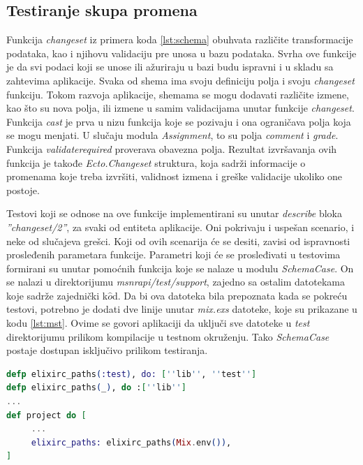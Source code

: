 \documentclass[12pt,oneside]{memoir}
\begin{document}
\subsection{Testiranje skupa promena}
\label{sec:change}
\par Funkcija \emph{changeset} iz primera koda \ref{lst:schema} obuhvata različite transformacije podataka, kao i njihovu validaciju pre unosa u bazu podataka. Svrha ove funkcije je da svi podaci koji se unose ili ažuriraju u bazi budu ispravni i u skladu sa zahtevima aplikacije. Svaka od shema ima svoju definiciju polja i svoju \emph{changeset} funkciju. Tokom razvoja aplikacije, shemama se mogu dodavati različite izmene, kao što su nova polja, ili izmene u samim validacijama unutar funkcije \emph{changeset}. Funkcija \emph{cast} je prva u nizu funkcija koje se pozivaju i ona ograničava polja koja se mogu menjati. U slučaju modula \emph{Assignment}, to su polja \emph{comment} i \emph{grade}. Funkcija \emph{validate{\textunderscore}required} proverava obavezna polja. Rezultat izvršavanja ovih funkcija je takođe \emph{Ecto.Changeset} struktura, koja sadrži informacije o promenama koje treba izvršiti, validnost izmena i greške validacije ukoliko one postoje.
\par Testovi koji se odnose na ove funkcije implementirani su unutar \emph{describe} bloka \emph{''changeset/2''}, za svaki od entiteta aplikacije. Oni pokrivaju i uspešan scenario, i neke od slučajeva grešci. Koji od ovih scenarija će se desiti, zavisi od ispravnosti prosleđenih parametara funkcije. Parametri koji će se prosleđivati u testovima formirani su unutar pomoćnih funkcija koje se nalaze u modulu \emph{SchemaCase}. On se nalazi u direktorijumu \emph{msnr{\textunderscore}api/test/support}, zajedno sa ostalim datotekama koje sadrže zajednički k$\hat{o}$d. Da bi ova datoteka bila prepoznata kada se pokreću testovi, potrebno je dodati dve linije unutar \emph{mix.exs} datoteke, koje su prikazane u kodu \ref{lst:mst}. Ovime se govori aplikaciji da uključi sve datoteke u \emph{test} direktorijumu prilikom kompilacije u testnom okruženju. Tako \emph{SchemaCase} postaje dostupan isključivo prilikom testiranja.

\begin{lstlisting}[language=elixir, caption={Uključivanje datoteka iz test direktorijuma pri kompilaciji u testnom okruženju},captionpos=b, label={lst:mst}]
defp elixirc_paths(:test), do: [''lib'', ''test'']
defp elixirc_paths(_), do :[''lib'']
...
def project do [
     ...
     elixirc_paths: elixirc_paths(Mix.env()), 
]
\end{lstlisting}
\end{document}
